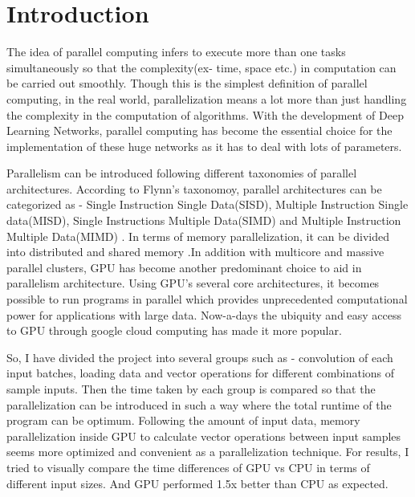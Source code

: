 \documentclass[11pt]{article}       %
\begin{document}
\section{Introduction} \label{intro}

The idea of parallel computing infers to execute more than one tasks simultaneously so that the complexity(ex- time, space etc.) in computation can be carried out smoothly. Though this is the simplest definition of parallel computing, in the real world, parallelization means a lot more than just handling the complexity in the computation of algorithms. With the development of Deep Learning Networks, parallel computing has become the essential choice for the implementation of these huge networks as it has to deal with lots of parameters.\newline

Parallelism can be introduced following different taxonomies of parallel architectures. According to Flynn's taxonomoy, parallel architectures can be categorized as - Single Instruction Single Data(SISD), Multiple Instruction Single data(MISD), Single Instructions Multiple Data(SIMD) and Multiple Instruction Multiple Data(MIMD) \cite{dr9}. In terms of memory parallelization, it can be divided into distributed and shared memory \cite{book1}.In addition with multicore and massive parallel clusters, GPU has become another predominant choice to aid in parallelism architecture. Using GPU's several core architectures, it becomes possible to run programs in parallel which provides unprecedented computational power for applications with large data. Now-a-days the ubiquity and easy access to GPU through google cloud computing \cite{mis1} has made it more popular.\newline

So, I have divided the project into several groups such as - convolution of each input batches, loading data and vector operations for different combinations of sample inputs. Then the time taken by each group is compared so that the parallelization can be introduced in such a way where the total runtime of the program can be optimum. Following the amount of input data, memory parallelization inside GPU to calculate vector operations between input samples seems more optimized and convenient as a parallelization technique.
For results, I tried to visually compare the time differences of GPU vs CPU in terms of different input sizes. And GPU performed 1.5x better than CPU as expected.\newline
\end{document}
